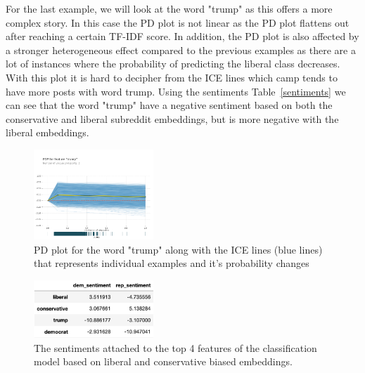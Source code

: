 \documentclass[conference]{IEEEtran}
\begin{document}
For the last example, we will look at the word "trump" as this offers a more complex story. In this case the PD plot is not linear as the PD plot flattens out after reaching a certain TF-IDF score. In addition, the PD plot is also affected by a stronger heterogeneous effect compared to the previous examples as there are a lot of instances where the probability of predicting the liberal class decreases. With this plot it is hard to decipher from the ICE lines which camp tends to have more posts with word trump. Using the sentiments Table~\ref{sentiments} we can see that the word "trump" have a negative sentiment based on both the conservative and liberal subreddit embeddings, but is more negative with the liberal embeddings.

\begin{figure}[tb]
    \centering
    \includegraphics[width=0.4\textwidth]{trump_pdp.pdf}
    \vspace{-2mm}
    \caption{PD plot for the word "trump" along with the ICE lines (blue lines) that represents individual examples and it's probability changes}
    \label{fig:trump_pdp}
    \vspace{-5mm}
\end{figure}

\begin{figure}[tb]
    \centering
    \includegraphics[width=0.4\textwidth]{sentiments.pdf}
    \vspace{-2mm}
    \caption{The sentiments attached to the top 4 features of the classification model based on liberal and conservative biased embeddings.}
    \label{fig:sentiments}
    \vspace{-5mm}
\end{figure}
\end{document}
